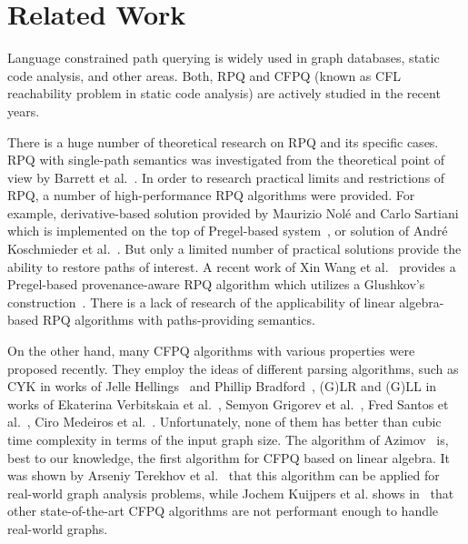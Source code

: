 \section{Related Work}

Language constrained path querying is widely used in graph databases, static code analysis, and other areas.
Both, RPQ and CFPQ (known as CFL reachability problem in static code analysis) are actively studied in the recent years.

There is a huge number of theoretical research on RPQ and its specific cases.
RPQ with single-path semantics was investigated from the theoretical point of view by Barrett et al.~\cite{barrett2000formal}.
In order to research practical limits and restrictions of RPQ, a number of high-performance RPQ algorithms were provided.
For example, derivative-based solution provided by Maurizio Nol\'{e} and Carlo Sartiani which is implemented on the top of Pregel-based system~\cite{10.1145/2949689.2949711}, or solution of Andr\'{e} Koschmieder et al.~\cite{10.1007/978-3-642-31235-9_12}.
But only a limited number of practical solutions provide the ability to restore paths of interest.
A recent work of Xin Wang et al.~\cite{Wang2019} provides a Pregel-based provenance-aware RPQ algorithm which utilizes a Glushkov's construction~\cite{Glushkov1961}.
There is a lack of research of the applicability of linear algebra-based RPQ algorithms with paths-providing semantics.

On the other hand, many CFPQ algorithms with various properties were proposed recently.
They employ the ideas of different parsing algorithms, such as CYK in works of Jelle Hellings~\cite{hellingsRelational} and Phillip Bradford~\cite{8249039}, (G)LR and (G)LL in works of Ekaterina Verbitskaia et al.~\cite{10.1007/978-3-319-41579-6_22}, Semyon Grigorev et al.~\cite{Grigorev:2017:CPQ:3166094.3166104}, Fred Santos et al.~\cite{10.1007/978-3-319-91662-0_17}, Ciro Medeiros et al.~\cite{Medeiros:2018:EEC:3167132.3167265}.
Unfortunately, none of them has better than cubic time complexity in terms of the input graph size.
The algorithm of Azimov~\cite{Azimov:2018:CPQ:3210259.3210264} is, best to our knowledge, the first algorithm for CFPQ based on linear algebra.
It was shown by Arseniy Terekhov et al.~\cite{10.1145/3398682.3399163} that this algorithm can be applied for real-world graph analysis problems, while Jochem Kuijpers et al. shows in~\cite{Kuijpers:2019:ESC:3335783.3335791} that other state-of-the-art CFPQ algorithms are not performant enough to handle real-world graphs.

